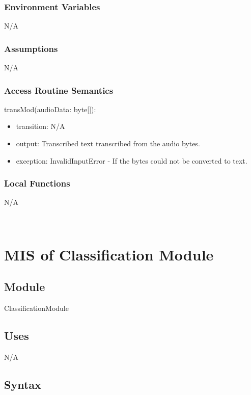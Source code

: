 \documentclass[12pt, titlepage]{article}
\begin{document}
\subsubsection{Environment Variables}

N/A

\subsubsection{Assumptions}

N/A

\subsubsection{Access Routine Semantics}

\noindent transMod(audioData: byte[]): 
\begin{itemize}
  \item transition: N/A
  \item output: Transcribed text transcribed from the audio bytes. 
  \item exception: InvalidInputError - If the bytes could not be converted to text. 
\end{itemize}

\subsubsection{Local Functions}

N/A

\newpage
~\newpage
  
\section{MIS of Classification Module} \label{Classification_Module} 

\subsection{Module}

ClassificationModule

\subsection{Uses}

N/A

\subsection{Syntax}
\end{document}
